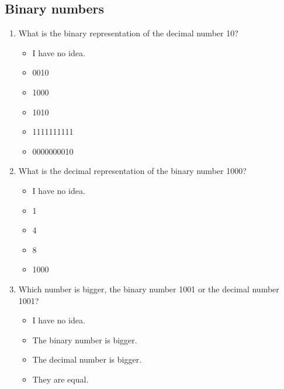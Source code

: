 \subsection{Binary numbers}
\begin{framed}
\begin{enumerate}
	\item What is the binary representation of the decimal number 10?
		\begin{itemize}
			\item I have no idea.
			\item 0010
			\item 1000
			\item 1010
			\item 1111111111
			\item 0000000010
		\end{itemize}
	\item What is the decimal representation of the binary number 1000?
		\begin{itemize}
			\item I have no idea.
			\item 1
			\item 4
			\item 8
			\item 1000
		\end{itemize}
	\item Which number is bigger, the binary number 1001 or the decimal number
		1001?
		\begin{itemize}
			\item I have no idea.
			\item The binary number is bigger.
			\item The decimal number is bigger.
			\item They are equal.
		\end{itemize}
\end{enumerate}
\end{framed}
